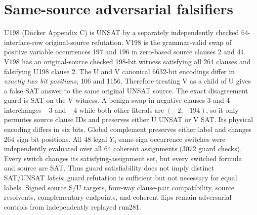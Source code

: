 \documentclass[11pt]{article}
\begin{document}
\section{Same-source adversarial falsifiers}
U198 (D\"ocker Appendix C) is UNSAT by a separately independently checked 64-interface-row original-source refutation. V198 is the grammar-valid swap of positive variable occurrences 197 and 196 in zero-based source clauses 2 and 44. V198 has an original-source checked 198-bit witness satisfying all 264 clauses and falsifying U198 clause 2. The U and V canonical 6632-bit encodings differ in \emph{exactly two bit positions}, 106 and 1156. Therefore treating V as a child of U gives a false SAT answer to the same original UNSAT source. The exact disagreement guard is SAT on the V witness.
A benign swap in negative clauses 3 and 4 interchanges $-3$ and $-4$ while both other literals are $(-2,-194)$, so it only permutes source clause IDs and preserves either U UNSAT or V SAT. Its physical encoding differs in six bits. Global complement preserves either label and changes 264 sign-bit positions.
All 48 legal $Y_6$ same-sign occurrence switches were independently evaluated over all 64 coherent assignments (3072 guard checks). Every switch changes its satisfying-assignment set, but every switched formula and source are SAT. Thus guard satisfiability does not imply distinct SAT/UNSAT \emph{labels}; guard refutation is sufficient but not necessary for equal labels. Signed source S/U targets, four-way clause-pair compatibility, source resolvents, complementary endpoints, and coherent flips remain adversarial controls from independently replayed run281.
\end{document}

